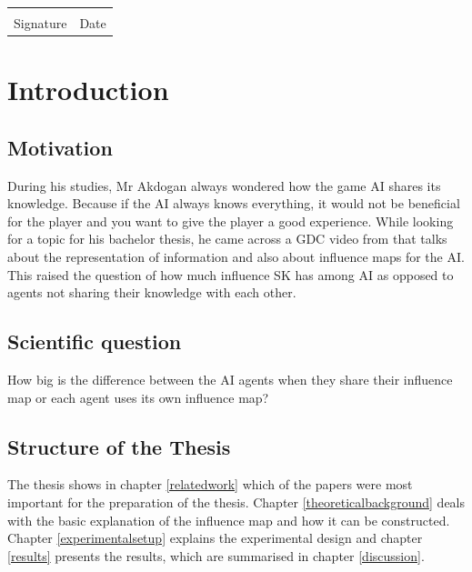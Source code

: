 \documentclass[]{report}
\begin{document}
	\vfill
	\noindent\begin{tabular}{ll}
		\makebox[2.5in]{\hrulefill} & \makebox[2.5in]{\hrulefill}\\
		Signature & Date\\[8ex]
	\end{tabular}
	\newpage
	
	\newpage
	\tableofcontents

	\chapter{Introduction}
	
	\section{Motivation}
	During his studies, Mr Akdogan always wondered how the game AI shares its knowledge. Because if the \ac{AI} always knows everything, it would not be beneficial for the player and you want to give the player a good experience. While looking for a topic for his bachelor thesis, he came across a \ac{GDC} video from \citep{knowledgeReprentation} that talks about the representation of information and also about influence maps for the \ac{AI}. This raised the question of how much influence \ac{SK} has among \ac{AI} as opposed to agents not sharing their knowledge with each other.
	
	\section{Scientific question}
	How big is the difference between the \ac{AI} agents when they share their influence map or each agent uses its own influence map? 
	\section{Structure of the Thesis}
	The thesis shows in chapter \ref{relatedwork} which of the papers were most important for the preparation of the thesis. Chapter \ref{theoreticalbackground} deals with the basic explanation of the influence map and how it can be constructed. Chapter \ref{experimentalsetup} explains the experimental design and chapter \ref{results} presents the results, which are summarised in chapter \ref{discussion}.
	
\end{document}
